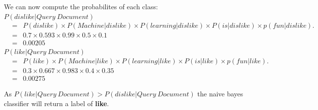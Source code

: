 \documentclass[nosolution]{ditpaper}
\begin{document}
\begin{answer}
We can now compute the probabilites of each class:\\

$P(dislike|Query~Document)$
			\begin{eqnarray*}
&=& P(dislike) \times P(Machine|dislike) \times P(learning|dislike) \times P(is|dislike) \times p(fun|dislike).\\
&=& 0.7 \times 0.593 \times 0.99 \times 0.5 \times 0.1\\
&=& 0.00205
			\end{eqnarray*}
$P(like|Query~Document)$
			\begin{eqnarray*}
&=& P(like) \times P(Machine|like) \times P(learning|like) \times P(is|like) \times p(fun|like).\\
&=& 0.3 \times 0.667 \times 0.983 \times 0.4 \times 0.35\\
&=& 0.00275
			\end{eqnarray*}
			
As $P(like|Query~Document) > P(dislike|Query~Document)$ the naive bayes classifier will return a label of \textbf{like}.
		\end{answer}
%
\newpage

\end{document}
